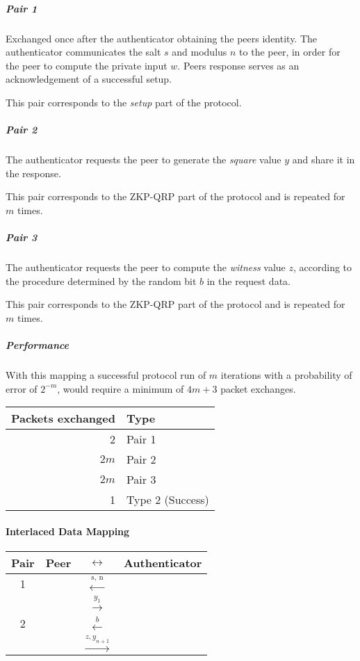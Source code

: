 \subparagraph{Pair 1} Exchanged once after the authenticator obtaining the peers identity. The authenticator communicates the salt $s$ and modulus $n$ to the peer, in order for the peer to compute the private input $w$. 
Peers response serves as an acknowledgement of a successful setup.

This pair corresponds to the \textit{setup} part of the protocol.

\subparagraph{Pair 2} The authenticator requests the peer to generate the \textit{square} value $y$ and share it in the response.

This pair corresponds to the ZKP-QRP part of the protocol and is repeated for $m$ times. 

\subparagraph{Pair 3} The authenticator requests the peer to compute the \textit{witness} value $z$, according to the procedure determined by the random bit $b$ in the request data.

This pair corresponds to the ZKP-QRP part of the protocol and is repeated for $m$ times.

\subparagraph{Performance}
With this mapping a successful protocol run of $m$ iterations with a probability of error of $2^{-m}$, would require a minimum of $4m + 3$ packet exchanges.

\bigskip

\begin{center}
	\begin{tabular}{r|l}
		Packets exchanged & Type\\
		\hline
		2 & Pair 1\\
		$2m$ & Pair 2\\
		$2m$ & Pair 3\\
		1 & Type 2 (Success)\\
	\end{tabular}
\end{center}

\paragraph{Interlaced Data Mapping}

\begin{center}
	\begin{tabular}{c|rcl}
	Pair & Peer  & $\leftrightarrow$ & Authenticator \\
	\hline
	1 & & $\xleftarrow{\text{s, n}}$ &\\
	&& $\xrightarrow{y_1}$&\\
	\hline
	2 & & $\xleftarrow{b}$&\\
	&& $\xrightarrow{z, y_{n+1}}$&\\
	\hline
	\end{tabular}
\end{center}

